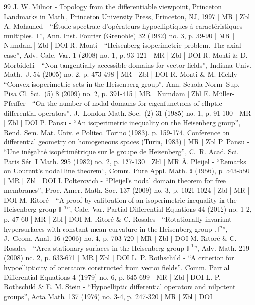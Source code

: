 \documentclass[10pt]{amsart}
\theoremstyle{definition}
\newcommand{\1}{\mathbbm{1}}
\begin{document}
\begin{thebibliography}{99}
J. W. Milnor - Topology from the differentiable viewpoint, Princeton Landmarks in Math., Princeton University Press, Princeton, NJ, 1997 | MR | Zbl
A. Mohamed - “Étude spectrale d’opérateurs hypoelliptiques à caractéristiques multiples. I”, Ann. Inst. Fourier (Grenoble) 32 (1982) no. 3, p. 39-90 | MR | Numdam | Zbl | DOI
R. Monti - “Heisenberg isoperimetric problem. The axial case”, Adv. Calc. Var. 1 (2008) no. 1, p. 93-121 | MR | Zbl | DOI
R. Monti \& D. Morbidelli - “Non-tangentially accessible domains for vector fields”, Indiana Univ. Math. J. 54 (2005) no. 2, p. 473-498 | MR | Zbl | DOI
R. Monti \& M. Rickly - “Convex isoperimetric sets in the Heisenberg group”, Ann. Scuola Norm. Sup. Pisa Cl. Sci. (5) 8 (2009) no. 2, p. 391-415 | MR | Numdam | Zbl
E. Müller-Pfeiffer - “On the number of nodal domains for eigenfunctions of elliptic differential operators”, J. London Math. Soc. (2) 31 (1985) no. 1, p. 91-100 | MR | Zbl | DOI
P. Pansu - “An isoperimetric inequality on the Heisenberg group”, Rend. Sem. Mat. Univ. e Politec. Torino (1983), p. 159-174, Conference on differential geometry on homogeneous spaces (Turin, 1983) | MR | Zbl
P. Pansu - “Une inégalité isopérimétrique sur le groupe de Heisenberg”, C. R. Acad. Sci. Paris Sér. I Math. 295 (1982) no. 2, p. 127-130 | Zbl | MR
Å. Pleijel - “Remarks on Courant’s nodal line theorem”, Comm. Pure Appl. Math. 9 (1956), p. 543-550 | MR | Zbl | DOI
I. Polterovich - “Pleijel’s nodal domain theorem for free membranes”, Proc. Amer. Math. Soc. 137 (2009) no. 3, p. 1021-1024 | Zbl | MR | DOI
M. Ritoré - “A proof by calibration of an isoperimetric inequality in the Heisenberg group ${\mathbb{H}}^n$”, Calc. Var. Partial Differential Equations 44 (2012) no. 1-2, p. 47-60 | MR | Zbl | DOI
M. Ritoré \& C. Rosales - “Rotationally invariant hypersurfaces with constant mean curvature in the Heisenberg group $\mathbb{H}^n$”, J. Geom. Anal. 16 (2006) no. 4, p. 703-720 | MR | Zbl | DOI
M. Ritoré \& C. Rosales - “Area-stationary surfaces in the Heisenberg group $\mathbb{H}^1$”, Adv. Math. 219 (2008) no. 2, p. 633-671 | MR | Zbl | DOI
L. P. Rothschild - “A criterion for hypoellipticity of operators constructed from vector fields”, Comm. Partial Differential Equations 4 (1979) no. 6, p. 645-699 | MR | Zbl | DOI
L. P. Rothschild \& E. M. Stein - “Hypoelliptic differential operators and nilpotent groups”, Acta Math. 137 (1976) no. 3-4, p. 247-320 | MR | Zbl | DOI

\end{thebibliography}
\end{document}
